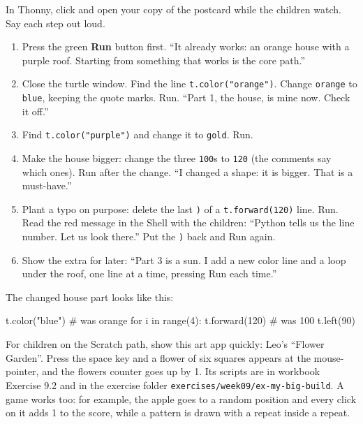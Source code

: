 \begin{workedexample}
In Thonny, click  and open your copy of the postcard while the children watch. Say each step out loud.
\begin{enumerate}[leftmargin=1.4em,itemsep=1pt]
  \item Press the green \textbf{Run} button first. \enquote{It already works: an orange house with a purple roof. Starting from something that works is the core path.}
  \item Close the turtle window. Find the line \texttt{t.color("orange")}. Change \texttt{orange} to \texttt{blue}, keeping the quote marks. Run. \enquote{Part 1, the house, is mine now. Check it off.}
  \item Find \texttt{t.color("purple")} and change it to \texttt{gold}. Run.
  \item Make the house bigger: change the three \texttt{100}s to \texttt{120} (the comments say which ones). Run after the change. \enquote{I changed a shape: it is bigger. That is a must-have.}
  \item Plant a typo on purpose: delete the last \texttt{)} of a \texttt{t.forward(120)} line. Run. Read the red message in the Shell with the children: \enquote{Python tells us the line number. Let us look there.} Put the \texttt{)} back and Run again.
  \item Show the extra for later: \enquote{Part 3 is a sun. I add a new color line and a loop under the roof, one line at a time, pressing Run each time.}
\end{enumerate}
The changed house part looks like this:
\end{workedexample}
\begin{pycode}
t.color("blue")     # was orange
for i in range(4):
    t.forward(120)  # was 100
    t.left(90)
\end{pycode}

\begin{tip}
For children on the Scratch path, show this art app quickly: Leo's \enquote{Flower Garden}. Press the space key and a flower of six squares appears at the mouse-pointer, and the flowers counter goes up by 1. Its scripts are in workbook Exercise 9.2 and in the exercise folder \texttt{exercises/week09/ex-my-big-build}. A game works too: for example, the apple goes to a random position and every click on it adds 1 to the score, while a pattern is drawn with a repeat inside a repeat.
\end{tip}

